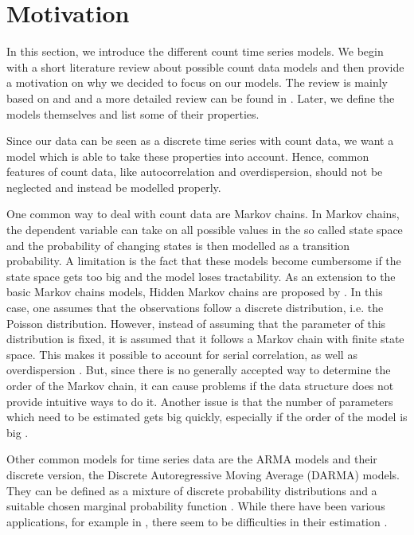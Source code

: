 \section{Motivation}
\label{sec:Ingarch Motivation}

In this section, we introduce the different count time series models. We begin with a short literature review about possible count data models and then provide a motivation on why we decided to focus on our models. The review is mainly based on \cite{Liboschik:2016} and \cite{Heinen:2003} and a more detailed review can be found in \cite{Zucchini:1997}. Later, we define the models themselves and list some of their properties. 

Since our data can be seen as a discrete time series with count data, we want a model which is able to take these properties into account. Hence, common features of count data, like autocorrelation and overdispersion, should not be neglected and instead be modelled properly.
 
One common way to deal with count data are Markov chains. In Markov chains, the dependent variable can take on all possible values in the so called state space and the probability of changing states is then modelled as a transition probability. A limitation is the fact that these models become cumbersome if the state space gets too big and the model loses tractability. As an extension to the basic Markov chains models, Hidden Markov chains are proposed by \cite{Zucchini:1997}. In this case, one assumes that the observations follow a discrete distribution, i.e. the Poisson distribution. However, instead of assuming that the parameter of this distribution is fixed, it is assumed that it follows a Markov chain with finite state space. This makes it possible to account for serial correlation, as well as overdispersion \cite{Zucchini:1997}.  But, since there is no generally accepted way to determine the order of the Markov chain, it can cause problems if the data structure does not provide intuitive ways to do it. Another issue is that the number of parameters which need to be estimated gets big quickly, especially if the order of the model is big \cite{Heinen:2003}. 

Other common models for time series data are the ARMA models and their discrete version, the Discrete Autoregressive Moving Average (DARMA) models. They can be defined as a mixture of discrete probability distributions and a suitable chosen marginal probability function \cite{Biswas:2009}. While there have been various applications, for example in \cite{Chang:1987}, there seem to be difficulties in their estimation \cite{Heinen:2003}. 

